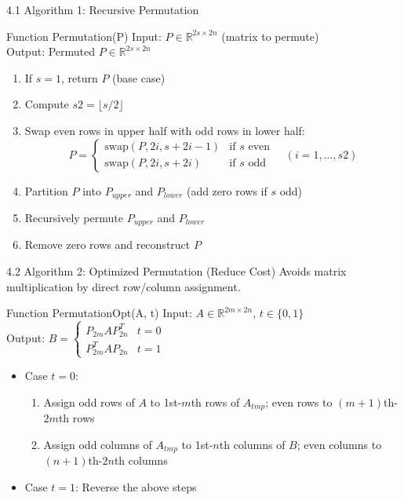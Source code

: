 \documentclass{beamer}
\begin{document}
\begin{frame}{4.1 Algorithm 1: Recursive Permutation}
  \begin{block}{Function Permutation(P)}
    Input: $P \in \mathbb{R}^{2s \times 2n}$ (matrix to permute) \\
    Output: Permuted $P \in \mathbb{R}^{2s \times 2n}$
    \begin{enumerate}
      \item If $s=1$, return $P$ (base case)
      \item Compute $s2 = \lfloor s/2 \rfloor$
      \item Swap even rows in upper half with odd rows in lower half:
        \[
        P = \begin{cases} 
        \text{swap}(P, 2i, s+2i-1) & \text{if } s \text{ even} \\
        \text{swap}(P, 2i, s+2i) & \text{if } s \text{ odd}
        \end{cases} \quad (i=1,\dots,s2)
        \]
      \item Partition $P$ into $P_{upper}$ and $P_{lower}$ (add zero rows if $s$ odd)
      \item Recursively permute $P_{upper}$ and $P_{lower}$
      \item Remove zero rows and reconstruct $P$
    \end{enumerate}
  \end{block}
\end{frame}

\begin{frame}{4.2 Algorithm 2: Optimized Permutation (Reduce Cost)}
  Avoids matrix multiplication by direct row/column assignment.
  
  \begin{block}{Function PermutationOpt(A, t)}
    Input: $A \in \mathbb{R}^{2m \times 2n}$, $t \in \{0,1\}$ \\ %
    Output: $B = \begin{cases} P_{2m} A P_{2n}^T & t=0 \\ P_{2m}^T A P_{2n} & t=1 \end{cases}$
    \begin{itemize}
      \item Case $t=0$:
        \begin{enumerate}
          \item Assign odd rows of $A$ to 1st-$m$th rows of $A_{tmp}$; 
                even rows to $(m+1)$th-$2m$th rows
          \item Assign odd columns of $A_{tmp}$ to 1st-$n$th columns of $B$; 
                even columns to $(n+1)$th-$2n$th columns
        \end{enumerate}
      \item Case $t=1$: Reverse the above steps
    \end{itemize}
  \end{block}
\end{frame}
\end{document}
